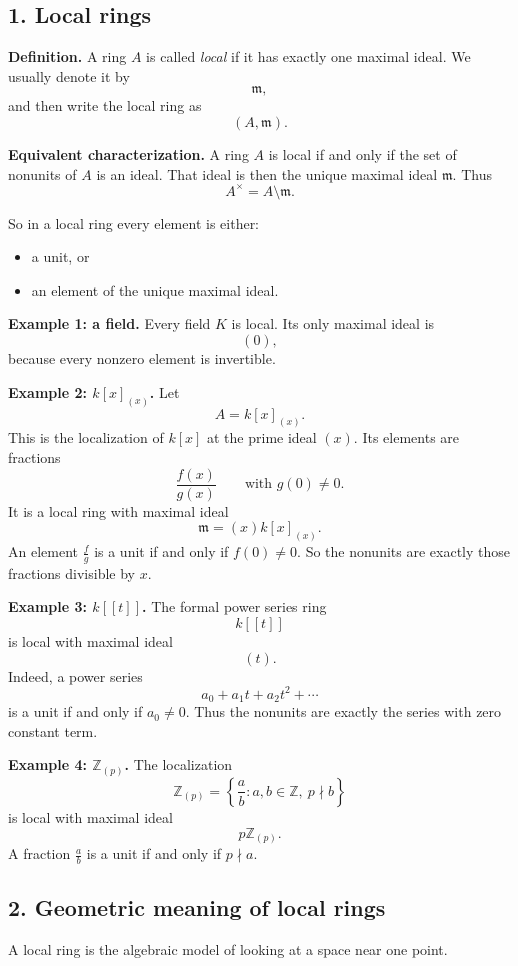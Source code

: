 \documentclass[12pt,a4paper]{article}
\theoremstyle{notespace}
\begin{document}
\subsection{1. Local rings}

\textbf{Definition.}
A ring \(A\) is called \emph{local} if it has exactly one maximal ideal. We usually denote it by
\[
\mathfrak m,
\]
and then write the local ring as
\[
(A,\mathfrak m).
\]

\textbf{Equivalent characterization.}
A ring \(A\) is local if and only if the set of nonunits of \(A\) is an ideal. That ideal is then the unique maximal ideal \(\mathfrak m\). Thus
\[
A^\times = A\setminus \mathfrak m.
\]

So in a local ring every element is either:
\begin{itemize}
	\item a unit, or
	\item an element of the unique maximal ideal.
\end{itemize}

\textbf{Example 1: a field.}
Every field \(K\) is local. Its only maximal ideal is
\[
(0),
\]
because every nonzero element is invertible.

\textbf{Example 2: \(k[x]_{(x)}\).}
Let
\[
A=k[x]_{(x)}.
\]
This is the localization of \(k[x]\) at the prime ideal \((x)\). Its elements are fractions
\[
\frac{f(x)}{g(x)}
\qquad \text{with } g(0)\neq 0.
\]
It is a local ring with maximal ideal
\[
\mathfrak m=(x)k[x]_{(x)}.
\]
An element \(\frac{f}{g}\) is a unit if and only if \(f(0)\neq 0\). So the nonunits are exactly those fractions divisible by \(x\).

\textbf{Example 3: \(k[[t]]\).}
The formal power series ring
\[
k[[t]]
\]
is local with maximal ideal
\[
(t).
\]
Indeed, a power series
\[
a_0+a_1t+a_2t^2+\cdots
\]
is a unit if and only if \(a_0\neq 0\). Thus the nonunits are exactly the series with zero constant term.

\textbf{Example 4: \(\mathbb Z_{(p)}\).}
The localization
\[
\mathbb Z_{(p)}=\left\{\frac ab : a,b\in \mathbb Z,\ p\nmid b\right\}
\]
is local with maximal ideal
\[
p\mathbb Z_{(p)}.
\]
A fraction \(\frac ab\) is a unit if and only if \(p\nmid a\).

\subsection{2. Geometric meaning of local rings}

A local ring is the algebraic model of looking at a space near one point.
\end{document}
